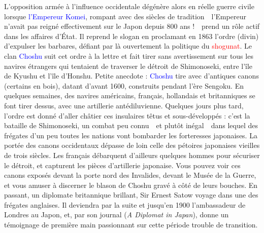 L'opposition armée à l'influence occidentale dégénère alors en réelle guerre
civile lorsque \textcolor{blue}{l'Empereur Komei}, rompant avec des siècles de
tradition~\incise~l'Empereur n'avait pas reigné effectivement sur le Japon
depuis 800 ans !~\incise~prend un rôle actif dans les affaires d'État. Il
reprend le slogan  en proclamant en 1863 l'ordre (divin)
d'expulser les barbares, défiant par là ouvertement la politique du
\textcolor{red}{shogunat}. Le clan \textcolor{blue}{Choshu} suit cet ordre à la
lettre et fait tirer sans avertissement sur tous les navires étrangers qui
tentaient de traverser le détroit de Shimonoseki, entre l'île de Kyushu et
l'île d'Honshu. Petite anecdote : \textcolor{blue}{Choshu} tire avec d'antiques
canons (certains en bois), datant d'avant 1600, construits pendant l'ère
Sengoku. En quelques semaines, des navires américains, français, hollandais et
britanniques se font tirer dessus, avec une artillerie antédiluvienne. Quelques
jours plus tard, l'ordre est donné d'aller châtier ces insulaires têtus et
sous-développés : c'est la bataille de Shimonoseki, un combat peu
connu~\incise~et plutôt inégal~\incise~dans lequel des frégates d'un peu toutes
les nations vont bombarder les forteresses japonaises. La portée des canons
occidentaux dépasse de loin celle des pétoires japonaises vieilles de trois
siècles. Les français débarquent d'ailleurs quelques hommes pour sécuriser le
détroit, et capturent les pièces d'artillerie japonaise. Vous pouvez voir ces
canons exposés devant la porte nord des Invalides, devant le Musée de la
Guerre, et vous amuser à discerner le blason de Choshu gravé à côté de leurs
bouches. En passant, un diplomate britannique brillant, Sir Ernest Satow voyage
dans une des frégates anglaises. Il deviendra par la suite et jusqu'en 1900
l'ambassadeur de Londres au Japon, et, par son journal (\emph{A Diplomat in
Japan}), donne un témoignage de première main passionnant sur cette période
trouble de transition.

